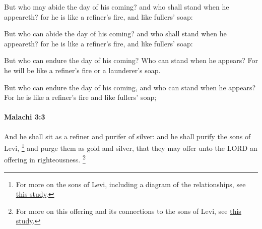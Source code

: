 			But who may abide the day of his coming? and who shall stand when he appeareth? for he is like a refiner’s fire, and like fullers’ soap:

			\begin{versebox}
					\item[BHS] 
					\item[LXX] 
					\item[ASV] But who can abide the day of his coming? and who shall stand when he appeareth? for he is like a refiner's fire, and like fullers' soap:
					\item[NIV] But who can endure the day of his coming? Who can stand when he appears? For he will be like a refiner’s fire or a launderer’s soap.
					\item[NRSV] But who can endure the day of his coming, and who can stand when he appears? For he is like a refiner’s fire and like fullers’ soap;
			\end{versebox}

		\paragraph{Malachi 3:3} %
			\label{MALACHI-3-3}

			And he shall sit as a refiner and purifer of silver: and he shall purify the sons of Levi,%
				\footnote{%
					For more on the sons of Levi, including a diagram of the relationships, see \hyperref[EXSS-OT-MALACHI-3-3-SONS]{this study}.
					}
			and purge them as gold and silver, that they may offer unto the LORD an offering in righteousness.%
				\footnote{%
					For more on this offering and its connections to the sons of Levi, see \hyperref[EXSS-OT-MALACHI-3-3-SONS]{this study}.
					}

